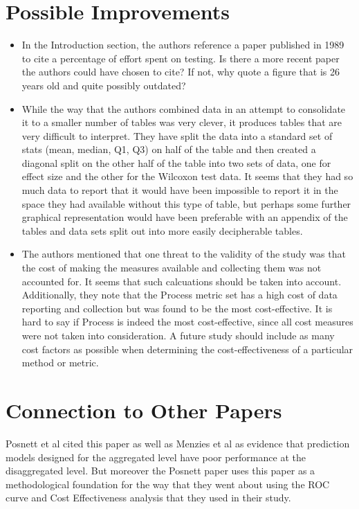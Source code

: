 \documentclass[english]{article}
\begin{document}
\section*{Possible Improvements}
\begin{itemize}
\item In the Introduction section, the authors reference a paper published
in 1989 to cite a percentage of effort spent on testing. Is there
a more recent paper the authors could have chosen to cite? If not,
why quote a figure that is 26 years old and quite possibly outdated? 
\item While the way that the authors combined data in an attempt to consolidate
it to a smaller number of tables was very clever, it produces tables
that are very difficult to interpret. They have split the data into
a standard set of stats (mean, median, Q1, Q3) on half of the table
and then created a diagonal split on the other half of the table into
two sets of data, one for effect size and the other for the Wilcoxon
test data. It seems that they had so much data to report that it would
have been impossible to report it in the space they had available
without this type of table, but perhaps some further graphical representation
would have been preferable with an appendix of the tables and data
sets split out into more easily decipherable tables. 
\item The authors mentioned that one threat to the validity of the study
was that the cost of making the measures available and collecting
them was not accounted for. It seems that such calcuations should
be taken into account. Additionally, they note that the Process metric
set has a high cost of data reporting and collection but was found
to be the most cost-effective. It is hard to say if Process is indeed
the most cost-effective, since all cost measures were not taken into
consideration. A future study should include as many cost factors
as possible when determining the cost-effectiveness of a particular
method or metric.
\end{itemize}

\section*{Connection to Other Papers}

Posnett et al \cite{posnett11} cited this paper as well as Menzies
et al \cite{menzies10} as evidence that prediction models designed
for the aggregated level have poor performance at the disaggregated
level. But moreover the Posnett paper uses this paper as a methodological
foundation for the way that they went about using the ROC curve and
Cost Effectiveness analysis that they used in their study.

 

 {}  
\end{document}
